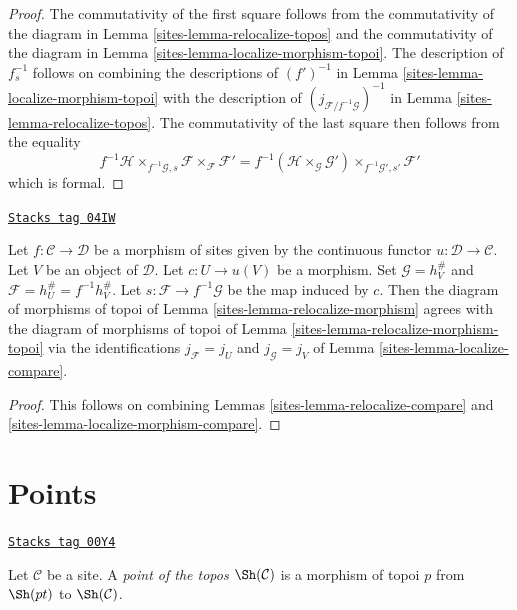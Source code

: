 \begin{proof}

The commutativity of the first square follows from the commutativity of
the diagram in
Lemma \ref{sites-lemma-relocalize-topos}
and the commutativity of the diagram in
Lemma \ref{sites-lemma-localize-morphism-topoi}.
The description of $f_s^{-1}$ follows on combining the descriptions
of $(f')^{-1}$ in
Lemma \ref{sites-lemma-localize-morphism-topoi}
with the description of
$(j_{\mathcal{F}/f^{-1}\mathcal{G}})^{-1}$ in
Lemma \ref{sites-lemma-relocalize-topos}.
The commutativity of the last square then follows from the
equality
$$
f^{-1}\mathcal{H} \times_{f^{-1}\mathcal{G}, s} \mathcal{F}
\times_\mathcal{F} \mathcal{F}'
=
f^{-1}(\mathcal{H} \times_\mathcal{G} \mathcal{G}')
\times_{f^{-1}\mathcal{G}', s'} \mathcal{F}'
$$
which is formal.
\end{proof}

\begin{lemma}
\label{sites-lemma-relocalize-morphism-compare}
\href{https://stacks.math.columbia.edu/tag/04IW}{\texttt{Stacks tag 04IW}}

Let $f : \mathcal{C} \to \mathcal{D}$ be a morphism of sites given
by the continuous functor $u : \mathcal{D} \to \mathcal{C}$.
Let $V$ be an object of $\mathcal{D}$. Let $c : U \to u(V)$ be a morphism.
Set $\mathcal{G} = h_V^\#$ and $\mathcal{F} = h_U^\# = f^{-1}h_V^\#$.
Let $s : \mathcal{F} \to f^{-1}\mathcal{G}$ be the map induced by $c$.
Then the diagram of morphisms of topoi of
Lemma \ref{sites-lemma-relocalize-morphism}
agrees with the diagram of morphisms of topoi of
Lemma \ref{sites-lemma-relocalize-morphism-topoi}
via the identifications $j_\mathcal{F} = j_U$
and $j_\mathcal{G} = j_V$ of
Lemma \ref{sites-lemma-localize-compare}.
\end{lemma}

\begin{proof}

This follows on combining
Lemmas \ref{sites-lemma-relocalize-compare} and
\ref{sites-lemma-localize-morphism-compare}.
\end{proof}

\section{Points}
\label{sites-section-points}
\begin{definition}
\label{sites-definition-point-topos}
\href{https://stacks.math.columbia.edu/tag/00Y4}{\texttt{Stacks tag 00Y4}}

Let $\mathcal{C}$ be a site.
A {\it point of the topos $\Sh(\mathcal{C})$}
is a morphism of topoi $p$ from $\Sh(pt)$ to
$\Sh(\mathcal{C})$.
\end{definition}

